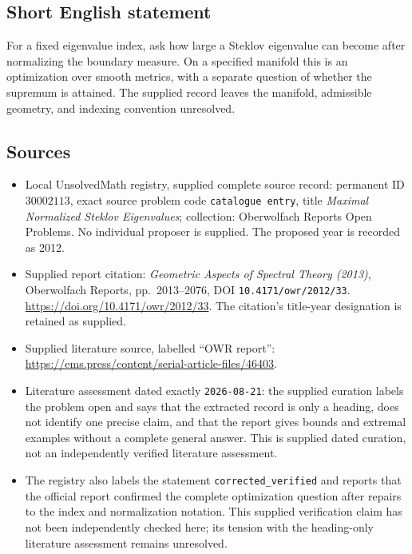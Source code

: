 \documentclass[11pt]{article}
\begin{document}
\subsection{Short English statement}
For a fixed eigenvalue index, ask how large a Steklov eigenvalue can become after normalizing the boundary measure. On a specified manifold this is an optimization over smooth metrics, with a separate question of whether the supremum is attained. The supplied record leaves the manifold, admissible geometry, and indexing convention unresolved.
\subsection{Sources}
\begin{itemize}
\item Local UnsolvedMath registry, supplied complete source record: permanent ID \(30002113\), exact source problem code \texttt{catalogue entry}, title \emph{Maximal Normalized Steklov Eigenvalues}; collection: Oberwolfach Reports Open Problems. No individual proposer is supplied. The proposed year is recorded as 2012.
\item Supplied report citation: \emph{Geometric Aspects of Spectral Theory (2013)}, Oberwolfach Reports, pp.~2013--2076, DOI \texttt{10.4171/owr/2012/33}. \url{https://doi.org/10.4171/owr/2012/33}. The citation's title-year designation is retained as supplied.
\item Supplied literature source, labelled ``OWR report'': \url{https://ems.press/content/serial-article-files/46403}.
\item Literature assessment dated exactly \texttt{2026-08-21}: the supplied curation labels the problem open and says that the extracted record is only a heading, does not identify one precise claim, and that the report gives bounds and extremal examples without a complete general answer. This is supplied dated curation, not an independently verified literature assessment.
\item The registry also labels the statement \texttt{corrected\_verified} and reports that the official report confirmed the complete optimization question after repairs to the index and normalization notation. This supplied verification claim has not been independently checked here; its tension with the heading-only literature assessment remains unresolved.
\end{itemize}
\end{document}

